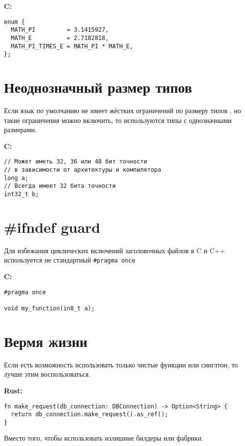 \documentclass[12p]{article}
\begin{document}
\textbf{C:}
\begin{verbatim}
enum {
  MATH_PI         = 3.1415927,
  MATH_E          = 2.7182818,
  MATH_PI_TIMES_E = MATH_PI * MATH_E,
};
\end{verbatim}

\section{Неоднозначный размер типов}

Если язык по умолчанию не имеет жёстких ограничений по размеру типов \cite{data_type_sizes}, но такие ограничения можно включить, то используются типы с однозначными размерами.\newline

\textbf{C:}
\begin{verbatim}
// Может иметь 32, 36 или 48 бит точности
// в зависимости от архитектуры и компилятора
long a;
// Всегда имеет 32 бита точности
int32_t b;
\end{verbatim}

\section{\#ifndef guard}

Для избежания циклических включений заголовочных файлов в C и C++ используется не стандартный \texttt{#pragma once} \newline

\textbf{C:}
\begin{verbatim}
#pragma once

void my_function(in8_t a);
\end{verbatim}

\section{Вермя жизни}

Если есть возможность использовать только чистые функции или синглтон, то лучше этим воспользоваться.\newline

\textbf{Rust:}
\begin{verbatim}
fn make_request(db_connection: DBConnection) -> Option<String> {
  return db_connection.make_request().as_ref();
}
\end{verbatim}

Вместо того, чтобы использовать излишние билдеры или фабрики.\newline
\end{document}
